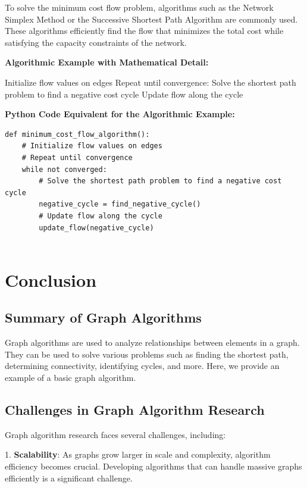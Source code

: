 \documentclass[12pt]{book} %
\begin{document}
To solve the minimum cost flow problem, algorithms such as the Network Simplex Method or the Successive Shortest Path Algorithm are commonly used. These algorithms efficiently find the flow that minimizes the total cost while satisfying the capacity constraints of the network.

\textbf{Algorithmic Example with Mathematical Detail:}
\FloatBarrier
\begin{algorithm}
\caption{Minimum Cost Flow Algorithm}
\begin{algorithmic}[1]
\State Initialize flow values on edges
\State Repeat until convergence:
\State \quad Solve the shortest path problem to find a negative cost cycle
\State \quad Update flow along the cycle
\end{algorithmic}
\end{algorithm}
\FloatBarrier
\textbf{Python Code Equivalent for the Algorithmic Example:}
\FloatBarrier
\begin{lstlisting}
def minimum_cost_flow_algorithm():
    # Initialize flow values on edges
    # Repeat until convergence
    while not converged:
        # Solve the shortest path problem to find a negative cost cycle
        negative_cycle = find_negative_cycle()
        # Update flow along the cycle
        update_flow(negative_cycle)
    
\end{lstlisting}
\section{Conclusion}
\subsection{Summary of Graph Algorithms}
Graph algorithms are used to analyze relationships between elements in a graph. They can be used to solve various problems such as finding the shortest path, determining connectivity, identifying cycles, and more. Here, we provide an example of a basic graph algorithm.

\subsection{Challenges in Graph Algorithm Research}
Graph algorithm research faces several challenges, including:

1. \textbf{Scalability}: As graphs grow larger in scale and complexity, algorithm efficiency becomes crucial. Developing algorithms that can handle massive graphs efficiently is a significant challenge.
\end{document}
